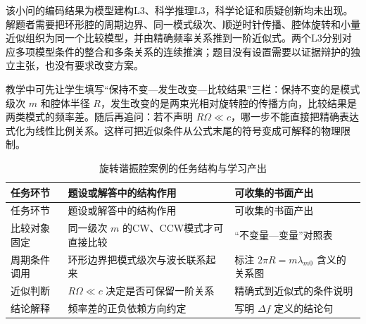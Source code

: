 \documentclass[
  12pt,
  a4paper,twoside,openany]{ctexbook}
\begin{document}
该小问的编码结果为模型建构L3、科学推理L3，科学论证和质疑创新均未出现。解题者需要把环形腔的周期边界、同一模式级次、顺逆时针传播、腔体旋转和小量近似组织为同一个比较模型，并由精确频率关系推到一阶近似式。两个L3分别对应多项模型条件的整合和多条关系的连续推演；题目没有设置需要以证据辩护的独立主张，也没有要求改变方案。

教学中可先让学生填写``保持不变---发生改变---比较结果''三栏：保持不变的是模式级次
\(m\) 和腔体半径
\(R\)，发生改变的是两束光相对旋转腔的传播方向，比较结果是两类模式的频率差。随后再追问：若不声明
\(R\Omega\ll c\)，哪一步不能直接把精确表达式化为线性比例关系。这样可把近似条件从公式末尾的符号变成可解释的物理限制。

\begin{longtable}[]{@{}
  >{\raggedright\arraybackslash}p{}
  >{\raggedright\arraybackslash}p{}
  >{\raggedright\arraybackslash}p{}@{}}
\caption{旋转谐振腔案例的任务结构与学习产出}\tabularnewline
\toprule\noalign{}
\rowcolor{ThesisPale}
\begin{minipage}[b]{\linewidth}\raggedright
任务环节
\end{minipage} & \begin{minipage}[b]{\linewidth}\raggedright
题设或解答中的结构作用
\end{minipage} & \begin{minipage}[b]{\linewidth}\raggedright
可收集的书面产出
\end{minipage} \\
\midrule\noalign{}
\endfirsthead
\toprule\noalign{}
\rowcolor{ThesisPale}
\begin{minipage}[b]{\linewidth}\raggedright
任务环节
\end{minipage} & \begin{minipage}[b]{\linewidth}\raggedright
题设或解答中的结构作用
\end{minipage} & \begin{minipage}[b]{\linewidth}\raggedright
可收集的书面产出
\end{minipage} \\
\midrule\noalign{}
\endhead
\bottomrule\noalign{}
\endlastfoot
比较对象固定 & 同一级次 \(m\) 的CW、CCW模式才可直接比较 &
``不变量---变量''对照表 \\
周期条件调用 & 环形边界把模式级次与波长联系起来 & 标注
\(2\pi R=m\lambda_{m0}\) 含义的关系图 \\
近似判断 & \(R\Omega\ll c\) 决定是否可保留一阶关系 &
精确式到近似式的条件说明 \\
结论解释 & 频率差的正负依赖方向约定 & 写明 \(\Delta f\) 定义的结论句 \\
\end{longtable}
\end{document}
